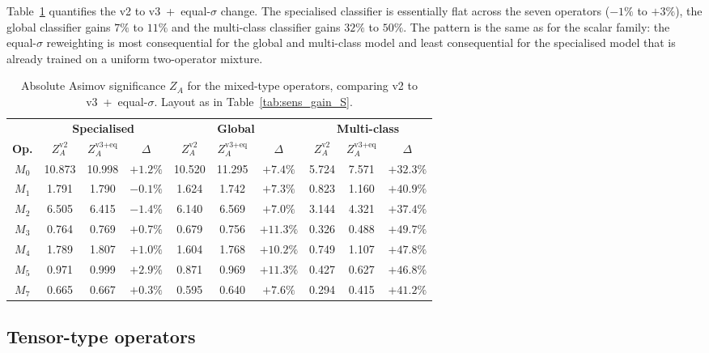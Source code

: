 Table~\ref{tab:sens_gain_M} quantifies the v2 to v3~+~equal-$\sigma$ change. The specialised classifier is essentially flat across the seven operators ($-1\%$ to $+3\%$), the global classifier gains $7\%$ to $11\%$ and the multi-class classifier gains $32\%$ to $50\%$. The pattern is the same as for the scalar family: the equal-$\sigma$ reweighting is most consequential for the global and multi-class model and least consequential for the specialised model that is already trained on a uniform two-operator mixture.

\begin{table}[htbp]
  \centering
  \caption{Absolute Asimov significance $Z_A$ for the mixed-type operators, comparing v2 to v3~+~equal-$\sigma$. Layout as in Table~\ref{tab:sens_gain_S}.}
  \label{tab:sens_gain_M}
  \begin{tabular}{|c|cc|c|cc|c|cc|c|}
    \hline
    & \multicolumn{3}{c|}{\textbf{Specialised}} & \multicolumn{3}{c|}{\textbf{Global}} & \multicolumn{3}{c|}{\textbf{Multi-class}} \\
    \textbf{Op.} & $Z_A^\text{v2}$ & $Z_A^\text{v3+eq}$ & $\Delta$ & $Z_A^\text{v2}$ & $Z_A^\text{v3+eq}$ & $\Delta$ & $Z_A^\text{v2}$ & $Z_A^\text{v3+eq}$ & $\Delta$ \\
    \hline
    $M_0$ & 10.873 & 10.998 & $+1.2\%$  & 10.520 & 11.295 & $+7.4\%$  &  5.724 &  7.571 & $+32.3\%$ \\
    $M_1$ &  1.791 &  1.790 & $-0.1\%$  &  1.624 &  1.742 & $+7.3\%$  &  0.823 &  1.160 & $+40.9\%$ \\
    $M_2$ &  6.505 &  6.415 & $-1.4\%$  &  6.140 &  6.569 & $+7.0\%$  &  3.144 &  4.321 & $+37.4\%$ \\
    $M_3$ &  0.764 &  0.769 & $+0.7\%$  &  0.679 &  0.756 & $+11.3\%$ &  0.326 &  0.488 & $+49.7\%$ \\
    $M_4$ &  1.789 &  1.807 & $+1.0\%$  &  1.604 &  1.768 & $+10.2\%$ &  0.749 &  1.107 & $+47.8\%$ \\
    $M_5$ &  0.971 &  0.999 & $+2.9\%$  &  0.871 &  0.969 & $+11.3\%$ &  0.427 &  0.627 & $+46.8\%$ \\
    $M_7$ &  0.665 &  0.667 & $+0.3\%$  &  0.595 &  0.640 & $+7.6\%$  &  0.294 &  0.415 & $+41.2\%$ \\
    \hline
  \end{tabular}
\end{table}

\subsection{Tensor-type operators}
\label{sec:sens_tensor}

